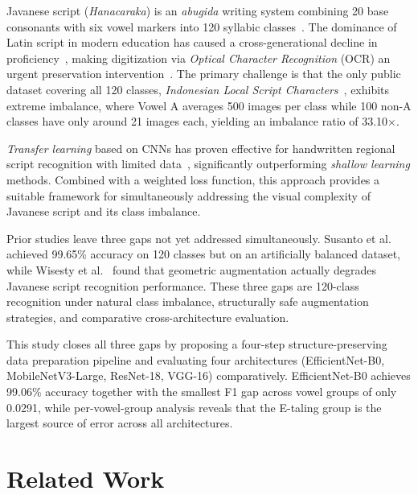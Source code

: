 \documentclass[conference]{IEEEtran}
\begin{document}
Javanese script (\textit{Hanacaraka}) is an \textit{abugida} writing
system combining 20 base consonants with six vowel markers into
120 syllabic classes~\cite{wicaksono2024}.
The dominance of Latin script in modern education has caused a
cross-generational decline in proficiency~\cite{faizin2025,wisesty2026},
making digitization via \textit{Optical Character Recognition}
(OCR) an urgent preservation intervention~\cite{widiarti2026}.
The primary challenge is that the only public dataset covering all
120 classes, \textit{Indonesian Local Script Characters}~\cite{wisesty2026},
exhibits extreme imbalance, where Vowel A averages 500 images per class
while 100 non-A classes have only around 21 images each, yielding
an imbalance ratio of 33.10$\times$.

\textit{Transfer learning} based on CNNs has proven effective for
handwritten regional script recognition with limited
data~\cite{ifriza2026,nindya2025}, significantly outperforming
\textit{shallow learning} methods.
Combined with a weighted loss function, this approach provides a
suitable framework for simultaneously addressing the visual complexity
of Javanese script and its class imbalance.

Prior studies leave three gaps not yet addressed simultaneously.
Susanto et al.~\cite{susantoIJAI2023} achieved 99.65\% accuracy on
120 classes but on an artificially balanced dataset, while Wisesty
et al.~\cite{wisesty2026} found that geometric augmentation actually
degrades Javanese script recognition performance.
These three gaps are 120-class recognition under natural class
imbalance, structurally safe augmentation strategies, and comparative
cross-architecture evaluation.

This study closes all three gaps by proposing a four-step
structure-preserving data preparation pipeline and evaluating four
architectures (EfficientNet-B0, MobileNetV3-Large, ResNet-18, VGG-16)
comparatively.
EfficientNet-B0 achieves 99.06\% accuracy together with the smallest
F1 gap across vowel groups of only 0.0291, while per-vowel-group
analysis reveals that the E-taling group is the largest source of
error across all architectures.


\section{Related Work}
\label{sec:related}
\end{document}
